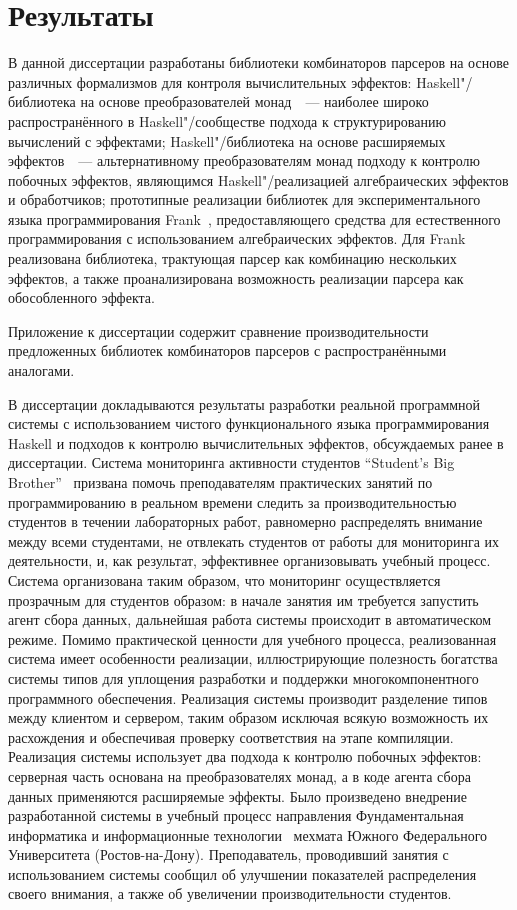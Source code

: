 \documentclass [fontsize=14pt, paper=a4, pagesize, DIV=calc]%
{article}
\begin{document}
\section{Результаты}

В данной диссертации разработаны библиотеки комбинаторов парсеров на основе
различных формализмов для контроля вычислительных эффектов: Haskell"/библиотека на
основе преобразователей монад~\cite{mdParse}~--- наиболее широко распространённого
в Haskell"/сообществе подхода к структурированию вычислений с эффектами; Haskell"/библиотека
на основе расширяемых эффектов~\cite{extEffParsers}~---
альтернативному преобразователям монад подходу к контролю
побочных эффектов, являющимся Haskell"/реализацией алгебраических эффектов и обработчиков;
прототипные реализации библиотек для экспериментального языка программирования
Frank~\cite{frankoparsec}, предоставляющего средства для естественного программирования
с использованием алгебраических эффектов. Для Frank реализована библиотека, трактующая
парсер как комбинацию нескольких эффектов, а также проанализирована возможность
реализации парсера как обособленного эффекта.

Приложение к диссертации содержит сравнение производительности
предложенных библиотек комбинаторов парсеров с распространёнными аналогами.

В диссертации докладываются результаты разработки реальной программной
системы с использованием чистого функционального языка программирования Haskell и
подходов к контролю вычислительных эффектов, обсуждаемых ранее в диссертации.
Система мониторинга активности студентов ``Student's Big Brother''~\cite{sbbRepo}
призвана помочь преподавателям практических занятий по программированию
в реальном времени следить за производительностью студентов в течении лабораторных
работ, равномерно распределять
внимание между всеми студентами, не отвлекать студентов от работы для мониторинга
их деятельности, и, как результат, эффективнее организовывать учебный процесс.
Система организована таким образом, что мониторинг осуществляется прозрачным для
студентов образом: в начале занятия им требуется запустить агент сбора данных, дальнейшая
работа системы происходит в автоматическом режиме. Помимо практической ценности для
учебного процесса, реализованная система имеет особенности реализации, иллюстрирующие
полезность богатства системы типов для уплощения разработки и поддержки многокомпонентного
программного обеспечения. Реализация системы производит разделение типов между клиентом
и сервером, таким образом исключая всякую возможность их расхождения и обеспечивая проверку
соответствия на этапе компиляции. Реализация системы использует два подхода к контролю побочных эффектов: серверная часть основана на преобразователях монад, а в коде агента сбора
данных применяются расширяемые эффекты. Было произведено внедрение разработанной системы
в учебный процесс направления Фундаментальная информатика и информационные
технологии~\cite{fiit} мехмата Южного Федерального Университета (Ростов-на-Дону).
Преподаватель, проводивший занятия с использованием системы сообщил об
улучшении показателей распределения своего внимания, а также об увеличении
производительности студентов.

\printbibliography[%
    heading=bibintoc%
    ,title=Библиография %
]
\end{document}
